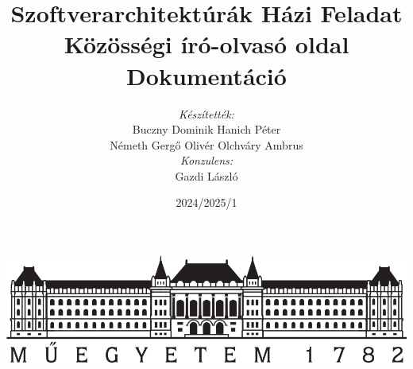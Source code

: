 \author{\textit{Készítették:}\\ Buczny Dominik \hspace{5pt} Hanich Péter \\ Németh Gergő Olivér \hspace{5pt} Olchváry Ambrus \\[10pt] \textit{Konzulens:}\\ Gazdi László}
\title{Szoftverarchitektúrák Házi Feladat \\ Közösségi író-olvasó oldal \\ \textbf{Dokumentáció}}
\date{2024/2025/1}
\maketitle
\thispagestyle{empty}
\begin{center}
    \includegraphics[width=\textwidth,height=\textheight,keepaspectratio]{./figures/logo.png}
\end{center}